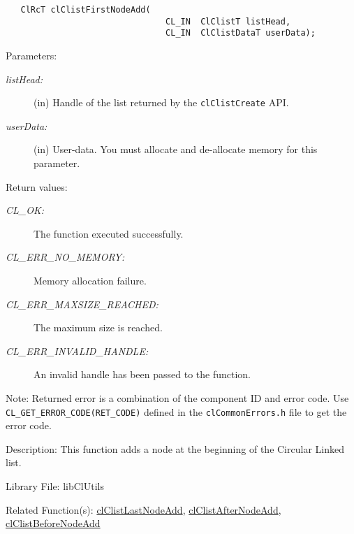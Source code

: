\begin{flushleft}
\begin{Desc}
\footnotesize\begin{verbatim}   ClRcT clClistFirstNodeAdd(
                         		CL_IN  ClClistT listHead,
                         		CL_IN  ClClistDataT userData);
\end{verbatim}
\normalsize
\end{Desc}
\begin{Desc}
\item[Parameters:]
\begin{description}
\item[{\em list\-Head:}](in) Handle of the list returned by the {\tt{clClistCreate}} API. \item[{\em user\-Data:}](in) User-data. 
You must allocate and de-allocate memory for this parameter.\end{description}
\end{Desc}
\begin{Desc}
\item[Return values:]
\begin{description}
\item[{\em CL\_\-OK:}]The function executed successfully. 
\item[{\em CL\_\-ERR\_\-NO\_\-MEMORY:}]Memory allocation failure. 
\item[{\em CL\_\-ERR\_\-MAXSIZE\_\-REACHED:}]The maximum size is reached. 
\item[{\em CL\_\-ERR\_\-INVALID\_\-HANDLE:}]An invalid handle has been passed to the function.\end{description}
\end{Desc}
\begin{Desc}
\item[Note:]Returned error is a combination of the component ID and error code. Use {\tt{CL\_\-GET\_\-ERROR\_\-CODE(RET\_\-CODE)}} defined in
the {\tt{clCommonErrors.h}} file to get the error code.\end{Desc}
\begin{Desc}
\item[Description:]This function adds a node at the beginning of the Circular Linked list.\end{Desc}
\begin{Desc}
\item[Library File:]lib\-Cl\-Utils\end{Desc}
\begin{Desc}
\item[Related Function(s):]\hyperlink{pagecl103}{cl\-Clist\-Last\-Node\-Add}, \hyperlink{pagecl104}{cl\-Clist\-After\-Node\-Add},
\hyperlink{pagecl105}{cl\-Clist\-Before\-Node\-Add} \end{Desc}
\newpage



\end{flushleft}
